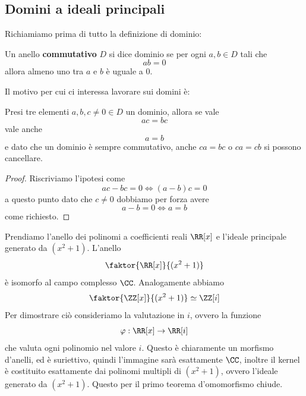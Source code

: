 \documentclass[11pt]{scrartcl}
\begin{document}
	\subsection{Domini a ideali principali}
	Richiamiamo prima di tutto la definizione di dominio:
	\begin{definition}[Dominio]
		Un anello \textbf{commutativo} $D$ si dice dominio se per ogni $a,b\in D$ tali che 
		$$ab=0$$
		allora almeno uno tra $a$ e $b$ è uguale a $0$.
	\end{definition}
	Il motivo per cui ci interessa lavorare sui domini è:
	\begin{lemma}
		Presi tre elementi $a,b,c\ne 0\in D$ un dominio, allora se vale
		$$ac=bc$$
		vale anche
		$$a=b$$
		e dato che un dominio è sempre commutativo, anche $ca=bc$ o $ca=cb$ si possono cancellare.
	\end{lemma}
	\begin{proof}
		Riscriviamo l'ipotesi come
		$$ac-bc=0 \iff (a-b)c=0$$
		a questo punto dato che $c\ne 0$ dobbiamo per forza avere
		$$a-b=0 \iff a=b$$
		come richiesto.
	\end{proof}
	\begin{example}
		Prendiamo l'anello dei polinomi a coefficienti reali $\RR[x]$ e l'ideale principale generato da $(x^2+1)$. L'anello
		$$\faktor{\RR[x]}{(x^2+1)}$$
		è isomorfo al campo complesso $\CC$. Analogamente abbiamo
		$$\faktor{\ZZ[x]}{(x^2+1)}\simeq \ZZ[i]$$
		Per dimostrare ciò consideriamo la valutazione in $i$, ovvero la funzione 
		$$\varphi:\RR[x]\to \RR[i]$$
		che valuta ogni polinomio nel valore $i$. Questo è chiaramente un morfismo d'anelli, ed è suriettivo, quindi l'immagine sarà esattamente $\CC$, inoltre il kernel è costituito esattamente dai polinomi multipli di $(x^2+1)$, ovvero l'ideale generato da $(x^2+1)$. Questo per il primo teorema d'omomorfismo chiude.  
	\end{example}
	
\end{document}
